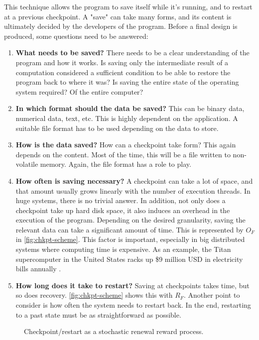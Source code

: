 {This technique allows the program to save itself while it's running, and to restart at a previous checkpoint. A "save" can take many forms, and its content is ultimately decided by the developers of the program. Before a final design is produced, some questions need to be answered:
\begin{enumerate}
	\item \textbf{What needs to be saved?} There needs to be a clear understanding of the program and how it works. Is saving only the intermediate result of a computation considered a sufficient condition to be able to restore the program back to where it was? Is saving the entire state of the operating system required? Of the entire computer? 
	\item \textbf{In which format should the data be saved?} This can be binary data, numerical data, text, etc. This is highly dependent on the application. A suitable file format has to be used depending on the data to store.
	\item \textbf{How is the data saved?} How can a checkpoint take form? This again depends on the content. Most of the time, this will be a file written to non-volatile memory. Again, the file format has a role to play.
	\item \textbf{How often is saving necessary?} A checkpoint can take a lot of space, and that amount usually grows linearly with the number of execution threads. In huge systems, there is no trivial answer. In addition, not only does a checkpoint take up hard disk space, it also induces an overhead in the execution of the program. Depending on the desired granularity, saving the relevant data can take a significant amount of time. This is represented by $O_F$ in \autoref{fig:chkpt-scheme}. This factor is important, especially in big distributed systems where computing time is expensive. As an example, the Titan supercomputer in the United States racks up \$9 million USD in electricity bills annually \cite{online:henn}.
	\item \textbf{How long does it take to restart?} Saving at checkpoints takes time, but so does recovery. \autoref{fig:chkpt-scheme} shows this with $R_F$. Another point to consider is how often the system needs to restart back. In the end, restarting to a past state must be as straightforward as possible.
\end{enumerate}
\begin{figure}[H]
	\centering
	
	\caption{Checkpoint/restart as a stochastic renewal reward process.\cite{misc:chkpt-scheme}}
	\label{fig:chkpt-scheme}
\end{figure}

}
